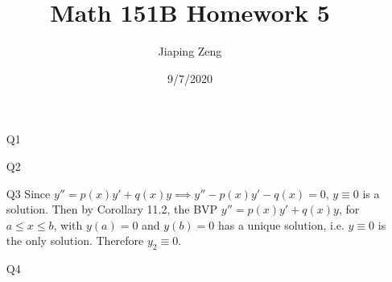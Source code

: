 \documentclass{article}
\title{Math 151B Homework 5}
\date{9/7/2020}
\author{Jiaping Zeng}
\begin{document}
\maketitle

\begin{itemize}
    \item [Q1]
    \item [Q2]
    \item [Q3] Since $y''=p(x)y'+q(x)y\implies y''-p(x)y'-q(x)=0$, $y\equiv 0$ is a solution. Then by Corollary 11.2, the BVP $y''=p(x)y'+q(x)y$, for $a\leq x\leq b$, with $y(a)=0$ and $y(b)=0$ has a unique solution, i.e. $y\equiv 0$ is the only solution. Therefore $y_2\equiv 0$.
    \item [Q4]
\end{itemize}
\end{document}
